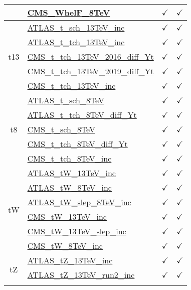 \documentclass{article}
\begin{document}
\begin{longtable}{|c|l|c|c|}
 & \href{https://arxiv.org}{CMS_WhelF_8TeV}  & $\checkmark$ & $\checkmark$
\\ \hline
\multirow{5}{*}{t13}
 & \href{https://arxiv.org}{ATLAS_t_sch_13TeV_inc}  & $\checkmark$ & $\checkmark$\\ \cline{2-4}
 & \href{https://arxiv.org}{ATLAS_t_tch_13TeV_inc}  & $\checkmark$ & $\checkmark$\\ \cline{2-4}
 & \href{https://arxiv.org}{CMS_t_tch_13TeV_2016_diff_Yt}  & $\checkmark$ & $\checkmark$\\ \cline{2-4}
 & \href{https://arxiv.org}{CMS_t_tch_13TeV_2019_diff_Yt}  & $\checkmark$ & $\checkmark$\\ \cline{2-4}
 & \href{https://arxiv.org}{CMS_t_tch_13TeV_inc}  & $\checkmark$ & $\checkmark$
\\ \hline
\multirow{5}{*}{t8}
 & \href{https://arxiv.org}{ATLAS_t_sch_8TeV}  & $\checkmark$ & $\checkmark$\\ \cline{2-4}
 & \href{https://arxiv.org}{ATLAS_t_tch_8TeV_diff_Yt}  & $\checkmark$ & $\checkmark$\\ \cline{2-4}
 & \href{https://arxiv.org}{CMS_t_sch_8TeV}  & $\checkmark$ & $\checkmark$\\ \cline{2-4}
 & \href{https://arxiv.org}{CMS_t_tch_8TeV_diff_Yt}  & $\checkmark$ & $\checkmark$\\ \cline{2-4}
 & \href{https://arxiv.org}{CMS_t_tch_8TeV_inc}  & $\checkmark$ & $\checkmark$
\\ \hline
\multirow{6}{*}{tW}
 & \href{https://arxiv.org}{ATLAS_tW_13TeV_inc}  & $\checkmark$ & $\checkmark$\\ \cline{2-4}
 & \href{https://arxiv.org}{ATLAS_tW_8TeV_inc}  & $\checkmark$ & $\checkmark$\\ \cline{2-4}
 & \href{https://arxiv.org}{ATLAS_tW_slep_8TeV_inc}  & $\checkmark$ & $\checkmark$\\ \cline{2-4}
 & \href{https://arxiv.org}{CMS_tW_13TeV_inc}  & $\checkmark$ & $\checkmark$\\ \cline{2-4}
 & \href{https://arxiv.org}{CMS_tW_13TeV_slep_inc}  & $\checkmark$ & $\checkmark$\\ \cline{2-4}
 & \href{https://arxiv.org}{CMS_tW_8TeV_inc}  & $\checkmark$ & $\checkmark$
\\ \hline
\multirow{5}{*}{tZ}
 & \href{https://arxiv.org}{ATLAS_tZ_13TeV_inc}  & $\checkmark$ & $\checkmark$\\ \cline{2-4}
 & \href{https://arxiv.org}{ATLAS_tZ_13TeV_run2_inc}  & $\checkmark$ & $\checkmark$\\ \cline{2-4}

\end{longtable}
\end{document}
